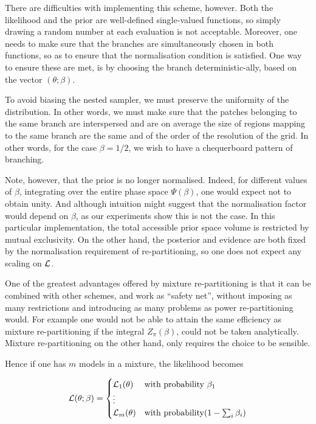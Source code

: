 \documentclass[usenatbib]{mnras}
\begin{document}
There are difficulties with implementing this scheme,
however. Both the likelihood and the prior are well-defined
single-valued functions, so simply drawing a random number at each
evaluation is not acceptable. Moreover, one needs to make sure
that the branches are simultaneously chosen in both functions, so
as to ensure that the normalisation condition is satisfied. One
way to ensure these are met, is by choosing the branch
deterministic-ally, based on the vector \((\theta; \beta)\). 

To avoid biasing the nested sampler, we must preserve the
uniformity of the distribution. In other words, we must make sure
that the patches belonging to the same branch are interspersed and
are on average the size of regions mapping to the same branch are
the same and of the order of the resolution of the grid. In other
words, for the case \(\beta=1/2\), we wish to have a chequerboard
pattern of branching. 

Note, however, that the prior is no longer normalised. Indeed, for
different values of \(\beta\), integrating over the entire phase
space \(\Psi(\beta)\), one would expect not to obtain unity. And
although intuition might suggest that the normalisation factor
would depend on \(\beta\), as our experiments show this is not the
case. In this particular implementation, the total accessible
prior space volume is restricted by mutual exclusivity. On the
other hand, the posterior and evidence are both fixed by the
normalisation requirement of re-partitioning, so one does not
expect any scaling on \({\cal L}\). 

One of the greatest advantages offered by mixture re-partitioning
is that it can be combined with other schemes, and work as
``safety net'', without imposing as many restrictions and
introducing as many problems as power re-partitioning would. For
example one would not be able to attain the same efficiency as
mixture re-partitioning if the integral \(Z_{\pi}(\beta)\), could not
be taken analytically. Mixture re-partitioning on the other hand,
only requires the choice to be sensible.

Hence if one has \(m\) models in a mixture, the likelihood becomes 

\begin{equation}
  {\cal L}(\theta; \beta)  = \begin{cases}
	{\cal L}_{1}(\theta) & \text{with probability } \beta_{1}\\
    \vdots\\
	{\cal L}_{m}(\theta) & \text{with probability} (1- \sum_{i}\beta_{i})
	\end{cases}
\end{equation}
\end{document}
